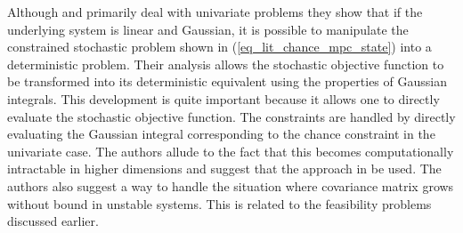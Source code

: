 Although \cite{yan1} and \cite{yan2} primarily deal with univariate problems they show that if the underlying system is linear and Gaussian, it is possible to manipulate the constrained stochastic problem shown in (\ref{eq_lit_chance_mpc_state}) into a deterministic problem. Their analysis allows the stochastic objective function to be transformed into its deterministic equivalent using the properties of Gaussian integrals. This development is quite important because it allows one to directly evaluate the stochastic objective function. The constraints are handled by directly evaluating the Gaussian integral corresponding to the chance constraint in the univariate case. The authors allude to the fact that this becomes computationally intractable in higher dimensions and suggest that the approach in \cite{vanhessem2} be used. The authors also suggest a way to handle the situation where covariance matrix grows without bound in unstable systems. This is related to the feasibility problems discussed earlier.

